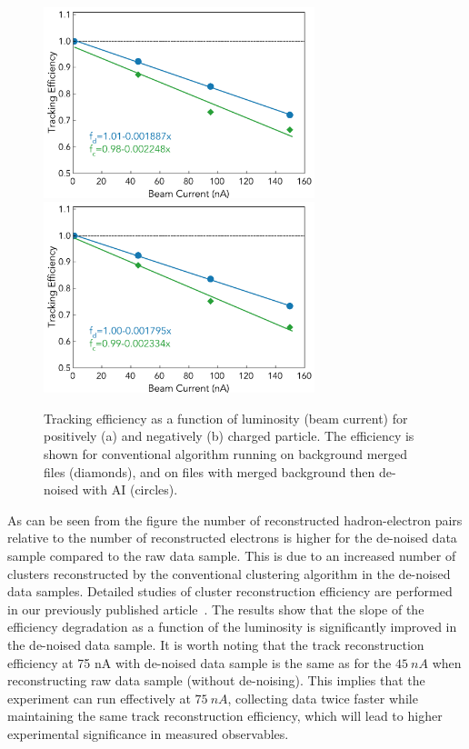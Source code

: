 \begin{figure}[!h]
\begin{center}
 \includegraphics[width=3.1in]{images/figure_lscan_pos.pdf}
 \includegraphics[width=3.1in]{images/figure_lscan_neg.pdf}
\caption {Tracking efficiency as a function of luminosity (beam current) for positively (a) and negatively (b) charged particle.  The efficiency is shown for
conventional algorithm running on background merged files (diamonds), and on files with merged background then de-noised with AI (circles).}
 \label{lscan::conv_dn}
 \end{center}
\end{figure}

As can be seen from the figure the number of reconstructed hadron-electron pairs relative to the number of reconstructed electrons is higher for the de-noised data sample compared to the raw data sample. This is due to an increased number of clusters reconstructed by the conventional clustering algorithm in the de-noised data samples. Detailed studies of cluster reconstruction efficiency are performed 
in our previously published article~\cite{Thomadakis:2022zcd}. 
The results show that the slope of the efficiency degradation as a function of the luminosity is significantly improved in the de-noised data sample. 
It is worth noting that the track reconstruction efficiency at 75 nA with de-noised data sample is the same as for the 
$45~nA$ when reconstructing raw data sample (without de-noising). This implies that the experiment can run effectively at $75~nA$, collecting data 
twice faster while maintaining the same track reconstruction efficiency, which will lead to higher experimental significance in measured observables. 

